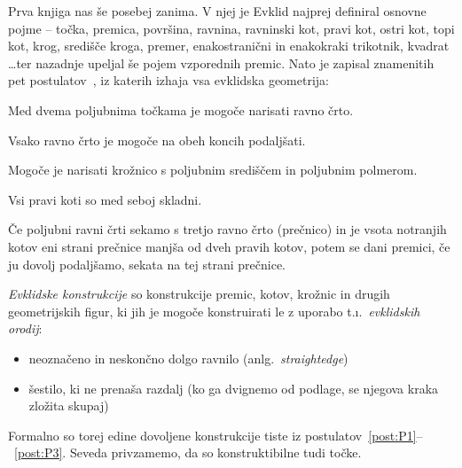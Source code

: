 Prva knjiga nas še posebej zanima. V njej je Evklid najprej definiral osnovne pojme -- točka, premica, površina, ravnina, ravninski kot, pravi kot, ostri kot, topi kot, krog, središče kroga, premer, enakostranični in enakokraki trikotnik, kvadrat \ldots ter nazadnje upeljal še pojem vzporednih premic. Nato je zapisal znamenitih pet postulatov~\cite{euclidI}, iz katerih izhaja vsa evklidska geometrija:

\renewcommand{\thepostulat}{P\arabic{postulat}}

\begin{postulat}
    \label{post:P1}
    Med dvema poljubnima točkama je mogoče narisati ravno črto.
\end{postulat}
\begin{postulat}
    \label{post:P2}
    Vsako ravno črto je mogoče na obeh koncih podaljšati.
\end{postulat}
\begin{postulat}
    \label{post:P3}
    Mogoče je narisati krožnico s poljubnim središčem in poljubnim polmerom.
\end{postulat}
\begin{postulat}
    \label{post:P4}
    Vsi pravi koti so med seboj skladni.
\end{postulat}
\begin{postulat}
    \label{post:P5}
    Če poljubni ravni črti sekamo s tretjo ravno črto (prečnico) in je vsota notranjih kotov eni strani prečnice manjša od dveh pravih kotov, potem se dani premici, če ju dovolj podaljšamo, sekata na tej strani prečnice.
\end{postulat}

\emph{Evklidske konstrukcije} so konstrukcije premic, kotov, krožnic in drugih geometrijskih figur, ki jih je mogoče konstruirati le z uporabo t.\i.\ \emph{evklidskih orodij}:

\begin{itemize}
    \item neoznačeno in neskončno dolgo ravnilo (anlg.\ \emph{straightedge})
    \item šestilo, ki ne prenaša razdalj (ko ga dvignemo od podlage, se njegova kraka zložita skupaj)
\end{itemize}

Formalno so torej edine dovoljene konstrukcije tiste iz postulatov~\ref{post:P1}--~\ref{post:P3}. Seveda privzamemo, da so konstruktibilne tudi točke.

